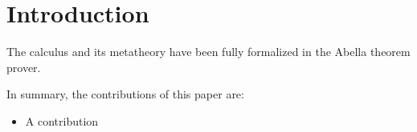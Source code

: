 \section{Introduction}

The calculus and its metatheory
have been fully formalized in the Abella theorem prover\cite{AbellaDesc}. %

In summary, the contributions of this paper are:

\begin{itemize}

\item A contribution

\end{itemize}